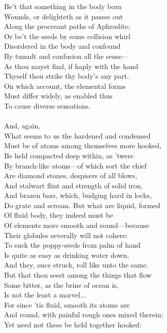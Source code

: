 Be't that something in the body born\\
Wounds, or delighteth as it passes out\\
Along the procreant paths of Aphrodite;\\
Or be't the seeds by some collision whirl\\
Disordered in the body and confound\\
By tumult and confusion all the sense—\\
As thou mayst find, if haply with the hand\\
Thyself thou strike thy body's any part.\\
On which account, the elemental forms\\
Must differ widely, as enabled thus\\
To cause diverse sensations.\\
\\
And, again,\\
What seems to us the hardened and condensed\\
Must be of atoms among themselves more hooked,\\
Be held compacted deep within, as 'twere\\
By branch-like atoms—of which sort the chief\\
Are diamond stones, despisers of all blows,\\
And stalwart flint and strength of solid iron,\\
And brazen bars, which, budging hard in locks,\\
Do grate and scream. But what are liquid, formed\\
Of fluid body, they indeed must be\\
Of elements more smooth and round—because\\
Their globules severally will not cohere:\\
To suck the poppy-seeds from palm of hand\\
Is quite as easy as drinking water down,\\
And they, once struck, roll like unto the same.\\
But that thou seest among the things that flow\\
Some bitter, as the brine of ocean is,\\
Is not the least a marvel...\\
For since 'tis fluid, smooth its atoms are\\
And round, with painful rough ones mixed therein;\\
Yet need not these be held together hooked:\\
